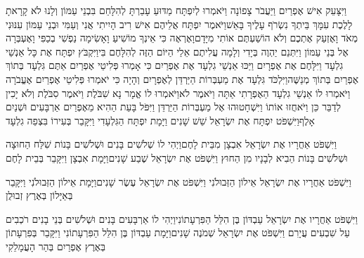 \documentclass[../main/main.tex]{subfiles}
\begin{document}
\begin{multicols*}{\ncols}
וַיִּצָּעֵק אִישׁ אֶפְרַיִם וַיַּעֲבֹר צָפוֹנָה וַיֹּאמְרוּ לְיִפְתָּח מַדּוּעַ עָבַרְתָּ לְהִלָּחֵם בִּבְנֵי עַמּוֹן וְלָנוּ לֹא קָרָאתָ לָלֶכֶת עִמָּךְ בֵּיתְךָ נִשְׂרֹף עָלֶיךָ בָּאֵשׁ\PreVerseSpace{}וַיֹּאמֶר יִפְתָּח אֲלֵיהֶם אִישׁ רִיב הָיִיתִי אֲנִי וְעַמִּי וּבְנֵי עַמּוֹן עִנּוּנִי\OmitEnd{} מְאֹד וָאֶזְעַק אֶתְכֶם וְלֹא הוֹשַׁעְתֶּם אוֹתִי מִיָּדָם\PreVerseSpace{}וָאֶרְאֶה כִּי אֵינְךָ מוֹשִׁיעַ וָאָשִׂימָה נַפְשִׁי בְכַפִּי וָאֶעְבְּרָה אֶל בְּנֵי עַמּוֹן וַיִּתְּנֵם יַהְוֶה בְּיָדִי וְלָמָה עֲלִיתֶם אֵלַי הַיּוֹם הַזֶּה לְהִלָּחֶם בִּי\PreVerseSpace{}וַיִּקְבֹּץ יִפְתָּח אֶת כָּל אַנְשֵׁי גִלְעָד וַיִּלָּחֶם אֶת אֶפְרָיִם וַיַּכּוּ אַנְשֵׁי גִלְעָד אֶת אֶפְרַיִם כִּי אָמְרוּ פְּלִיטֵי אֶפְרַיִם אַתֶּם גִּלְעָד בְּתוֹךְ אֶפְרַיִם בְּתוֹךְ מְנַשֶּׁה\PreVerseSpace{}וַיִּלְכֹּד גִּלְעָד אֶת מַעְבְּרוֹת הַיַּרְדֵּן לְאֶפְרָיִם וְהָיָה כִּי יֹאמְרוּ פְּלִיטֵי אֶפְרַיִם אֶעֱבֹרָה וַיֹּאמְרוּ לוֹ אַנְשֵׁי גִלְעָד הַאֶפְרָתִי אַתָּה וַיֹּאמֶר לֹא\PreVerseSpace{}וַיֹּאמְרוּ לוֹ אֱמָר נָא שִׁבֹּלֶת וַיֹּאמֶר סִבֹּלֶת וְלֹא יָכִין לְדַבֵּר כֵּן וַיֹּאחֲזוּ אוֹתוֹ וַיִּשְׁחָטוּהוּ אֶל מַעְבְּרוֹת הַיַּרְדֵּן וַיִּפֹּל בָּעֵת הַהִיא מֵאֶפְרַיִם אַרְבָּעִים וּשְׁנַיִם אָלֶף\PreVerseSpace{}וַיִּשְׁפֹּט יִפְתָּח אֶת יִשְׂרָאֵל שֵׁשׁ שָׁנִים וַיָּמָת יִפְתָּח הַגִּלְעָדִי וַיִּקָּבֵר בְּעִירוֹ בִּצְפֵה\SubEnd{} גִלְעָד\OpenSection{}\par
{}וַיִּשְׁפֹּט אַחֲרָיו אֶת יִשְׂרָאֵל אִבְצָן מִבֵּית לָחֶם\PreVerseSpace{}וַיְהִי לוֹ שְׁלֹשִׁים בָּנִים וּשְׁלֹשִׁים בָּנוֹת שִׁלַּח הַחוּצָה וּשְׁלֹשִׁים בָּנוֹת הֵבִיא לְבָנָיו מִן הַחוּץ וַיִּשְׁפֹּט אֶת יִשְׂרָאֵל שֶׁבַע שָׁנִים\PreVerseSpace{}וַיָּמָת אִבְצָן וַיִּקָּבֵר בְּבֵית לָחֶם\OpenSection{}\par
{}וַיִּשְׁפֹּט אַחֲרָיו אֶת יִשְׂרָאֵל אֵילוֹן הַזְּבוּלֹנִי וַיִּשְׁפֹּט אֶת יִשְׂרָאֵל עֶשֶׂר שָׁנִים\PreVerseSpace{}וַיָּמָת אֵילוֹן הַזְּבוּלֹנִי וַיִּקָּבֵר בְּאַיָּלוֹן בְּאֶרֶץ זְבוּלֻן\OpenSection{}\par
{}וַיִּשְׁפֹּט אַחֲרָיו אֶת יִשְׂרָאֵל עַבְדּוֹן בֶּן הִלֵּל הַפִּרְעָתוֹנִי\PreVerseSpace{}וַיְהִי לוֹ אַרְבָּעִים בָּנִים וּשְׁלֹשִׁים בְּנֵי בָנִים רֹכְבִים עַל שִׁבְעִים עֲיָרִם וַיִּשְׁפֹּט אֶת יִשְׂרָאֵל שְׁמֹנֶה שָׁנִים\PreVerseSpace{}וַיָּמָת עַבְדּוֹן בֶּן הִלֵּל הַפִּרְעָתוֹנִי וַיִּקָּבֵר בְּפִרְעָתוֹן בְּאֶרֶץ אֶפְרַיִם בְּהַר הָעֲמָלֵקִי\OpenSection{}\par

\end{multicols*}
\end{document}
